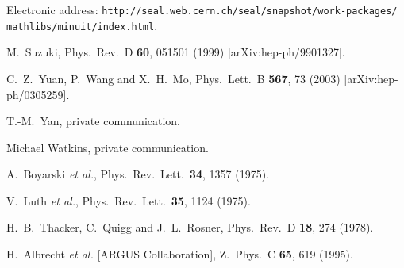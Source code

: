 \documentclass{cornell}
\begin{document}
\begin{thebibliography}{99}
Electronic address: {\tt http://seal.web.cern.ch/seal/snapshot/work-packages/
mathlibs/minuit/index.html}.

M.~Suzuki,
  Phys.\ Rev.\ D {\bf 60}, 051501 (1999)
  [arXiv:hep-ph/9901327].

C.~Z.~Yuan, P.~Wang and X.~H.~Mo,
  Phys.\ Lett.\ B {\bf 567}, 73 (2003)
  [arXiv:hep-ph/0305259].

T.-M.~Yan, private communication.

Michael Watkins, private communication.

A.~Boyarski {\it et al.},
  Phys.\ Rev.\ Lett.\  {\bf 34}, 1357 (1975).

V.~Luth {\it et al.},
  Phys.\ Rev.\ Lett.\  {\bf 35}, 1124 (1975).

H.~B.~Thacker, C.~Quigg and J.~L.~Rosner,
  Phys.\ Rev.\ D {\bf 18}, 274 (1978).

H.~Albrecht {\it et al.}  [ARGUS Collaboration],
  Z.\ Phys.\ C {\bf 65}, 619 (1995).

\end{thebibliography}
\end{document}
